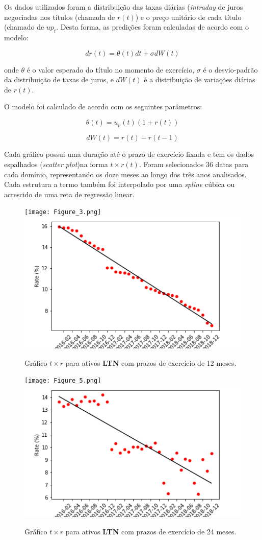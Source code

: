 \documentclass{article}
\begin{document}
Os dados utilizados foram a distribuição das taxas diárias (\emph{intraday} de juros negociadas nos títulos (chamada de $r(t)$) e o preço unitário de cada título (chamado de $up_{t}$.
Desta forma, as predições foram calculadas de acordo com o modelo:

\begin{equation}
	d r(t) = \theta (t) dt + \sigma dW(t)
\end{equation}

onde $\theta$ é o valor esperado do título no momento de exercício, $\sigma$ é o desvio-padrão da distribuição de taxas de juros, e $dW(t)$ é a distribuição de variações diárias de $r(t)$.

O modelo foi calculado de acordo com os seguintes parâmetros:

\begin{equation}
	\theta (t) = u_{p}(t) (1 + r(t))
\end{equation}

\begin{equation}
	d W(t) = r(t) - r(t - 1)
\end{equation}

Cada gráfico possui uma duração até o prazo de exercício fixada e tem os dados espalhados (\emph{scatter plot})na forma $t \times r(t)$. 
Foram selecionados 36 datas para cada domínio, representando os doze meses ao longo dos três anos analisados.
Cada estrutura a termo também foi interpolado por uma \emph{spline} cúbica ou acrescido de uma reta de regressão linear. 


\begin{figure}[H]
	\texttt{[image: Figure\_3.png]}
	\includegraphics[width=0.6\linewidth]{Figure_4.png}
	\centering
	
	\caption{Gráfico $t \times r$ para ativos \textbf{LTN} com prazos de exercício de 12 meses.}
	\label{}
\end{figure}

\begin{figure}[H]
	\texttt{[image: Figure\_5.png]}
	\includegraphics[width=0.6\linewidth]{Figure_6.png}
	\centering
	
	\caption{Gráfico $t \times r$ para ativos \textbf{LTN} com prazos de exercício de 24 meses.}
	\label{}
\end{figure}
\end{document}
